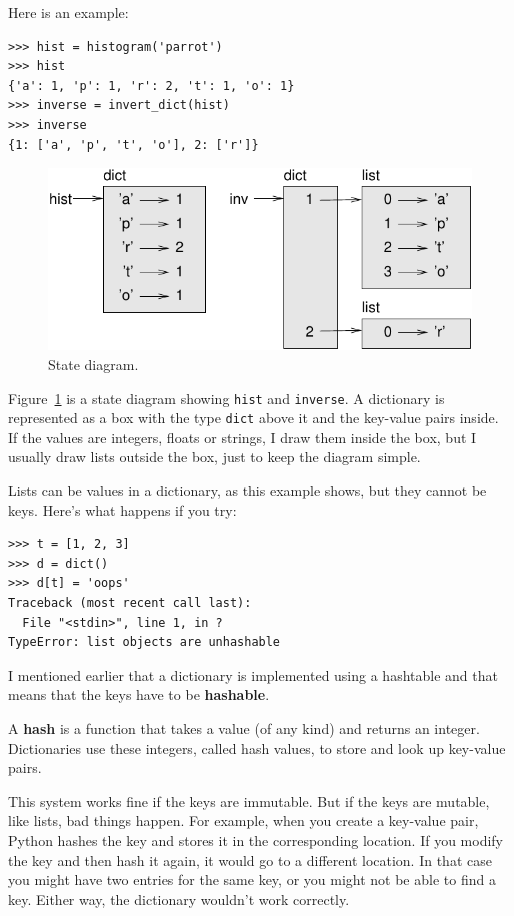 \documentclass[10pt]{book}
\begin{document}
Here is an example:

\begin{verbatim}
>>> hist = histogram('parrot')
>>> hist
{'a': 1, 'p': 1, 'r': 2, 't': 1, 'o': 1}
>>> inverse = invert_dict(hist)
>>> inverse
{1: ['a', 'p', 't', 'o'], 2: ['r']}
\end{verbatim}

\begin{figure}
\centerline
{\includegraphics[scale=0.8]{figs/dict1.pdf}}
\caption{State diagram.}
\label{fig.dict1}
\end{figure}

Figure~\ref{fig.dict1} is a state diagram showing {\tt hist} and {\tt inverse}.
A dictionary is represented as a box with the type {\tt dict} above it
and the key-value pairs inside.  If the values are integers, floats or
strings, I draw them inside the box, but I usually draw lists
outside the box, just to keep the diagram simple.

Lists can be values in a dictionary, as this example shows, but they
cannot be keys.  Here's what happens if you try:


\begin{verbatim}
>>> t = [1, 2, 3]
>>> d = dict()
>>> d[t] = 'oops'
Traceback (most recent call last):
  File "<stdin>", line 1, in ?
TypeError: list objects are unhashable
\end{verbatim}
%
I mentioned earlier that a dictionary is implemented using
a hashtable and that means that the keys have to be {\bf hashable}.

A {\bf hash} is a function that takes a value (of any kind)
and returns an integer.  Dictionaries use these integers,
called hash values, to store and look up key-value pairs.

This system works fine if the keys are immutable.  But if the
keys are mutable, like lists, bad things happen.  For example,
when you create a key-value pair, Python hashes the key and 
stores it in the corresponding location.  If you modify the
key and then hash it again, it would go to a different location.
In that case you might have two entries for the same key,
or you might not be able to find a key.  Either way, the
dictionary wouldn't work correctly.
\end{document}
